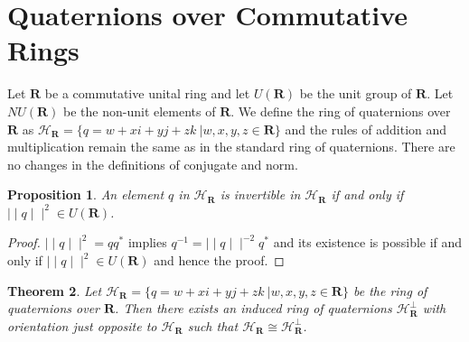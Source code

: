 \documentclass[sn-mathphys,Numbered]{sn-jnl}%
\theoremstyle{thmstyleone}
\newtheorem{theorem}{Theorem}
\newtheorem{proposition}[theorem]{Proposition}
\theoremstyle{thmstyletwo}
\theoremstyle{thmstylethree}
\begin{document}
\section{Quaternions over Commutative Rings}
Let $\mathbf{R}$ be a commutative unital ring and let $U(\mathbf{R})$ be the unit group of $\mathbf{R}$. Let $NU(\mathbf{R})$ be the non-unit elements of $\mathbf{R}$. 
We define the ring of quaternions over $\mathbf{R}$ as $\mathcal{H_{\mathbf{R}}}=\{ q=w+xi+yj+zk \ | w,x,y,z\in \mathbf{R}\}$ and the rules of addition and multiplication remain the same as in the standard ring of quaternions. There are no changes in the definitions of conjugate and norm. 
\begin{proposition}
An element $q$ in $\mathcal{H_{\mathbf{R}}}$ is invertible in $\mathcal{H_{\mathbf{R}}}$ if and only if $\mid\mid q \mid\mid^{2} \in U(\mathbf{R})$. 
\end{proposition}
\begin{proof}
$\mid\mid q \mid\mid^{2}=qq^{*}$ implies $q^{-1}=\mid\mid q \mid\mid^{-2}q^{*}$ and its existence is possible if and only if $\mid\mid q \mid\mid^{2} \in U(\mathbf{R})$ and hence the proof. 
\end{proof}
\begin{theorem}
Let $\mathcal{H_{\mathbf{R}}}=\{ q=w+xi+yj+zk \ | w,x,y,z\in \mathbf{R}\}$ be the ring of quaternions over $\mathbf{R}$. Then there exists an induced ring of quaternions $\mathcal{H_{\mathbf{R}}^{\perp}}$ with orientation just opposite to $\mathcal{H_{\mathbf{R}}}$ such that $\mathcal{H}_{\mathbf{R}}\cong\mathcal{H_{\mathbf{R}}^{\perp}}$. 
\end{theorem}
\end{document}
